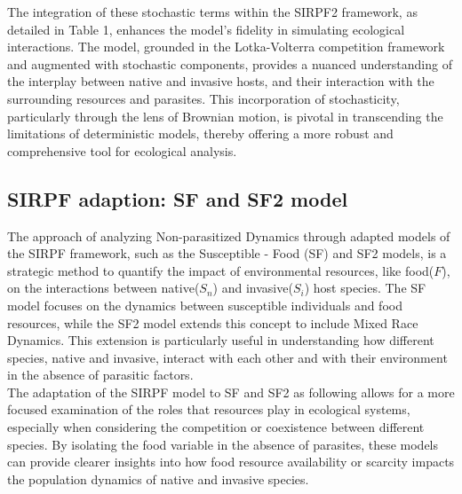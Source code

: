 \documentclass[12pt]{article}
\begin{document}
The integration of these stochastic terms within the SIRPF2 framework, as detailed in Table 1, enhances the model's fidelity in simulating ecological interactions. The model, grounded in the Lotka-Volterra competition framework and augmented with stochastic components, provides a nuanced understanding of the interplay between native and invasive hosts, and their interaction with the surrounding resources and parasites. This incorporation of stochasticity, particularly through the lens of Brownian motion, is pivotal in transcending the limitations of deterministic models, thereby offering a more robust and comprehensive tool for ecological analysis.\\

\subsection{SIRPF adaption: SF and SF2 model}

The approach of analyzing Non-parasitized Dynamics through adapted models of the SIRPF framework, such as the Susceptible - Food (SF) and SF2 models, is a strategic method to quantify the impact of environmental resources, like food($F$), on the interactions between native($S_n$) and invasive($S_i$) host species. The SF model focuses on the dynamics between susceptible individuals and food resources, while the SF2 model extends this concept to include Mixed Race Dynamics. This extension is particularly useful in understanding how different species, native and invasive, interact with each other and with their environment in the absence of parasitic factors.\\

The adaptation of the SIRPF model to SF and SF2 as following allows for a more focused examination of the roles that resources play in ecological systems, especially when considering the competition or coexistence between different species. By isolating the food variable in the absence of parasites, these models can provide clearer insights into how food resource availability or scarcity impacts the population dynamics of native and invasive species.\\
\end{document}
